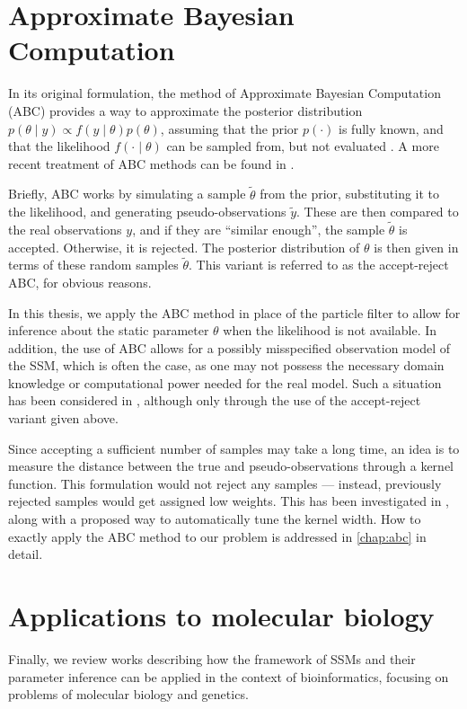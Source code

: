\section{Approximate Bayesian Computation}
In its original formulation, the method of Approximate Bayesian Computation (ABC) provides a way to approximate the posterior distribution $p(\theta \mid y) \propto f(y \mid \theta) p(\theta)$, assuming that the prior $p(\cdot)$ is fully known, and that the likelihood $f(\cdot \mid \theta)$ can be sampled from, but not evaluated \citep{abc-old-old, abc-old}. A more recent treatment of ABC methods can be found in \cite{abc-recent}.

Briefly, ABC works by simulating a sample $\tilde{\theta}$ from the prior, substituting it to the likelihood, and generating pseudo-observations $\tilde{y}$. These are then compared to the real observations $y$, and if they are ``similar enough'', the sample $\tilde{\theta}$ is accepted. Otherwise, it is rejected. The posterior distribution of $\theta$ is then given in terms of these random samples $\tilde{\theta}$. This variant is referred to as the accept-reject ABC, for obvious reasons.

In this thesis, we apply the ABC method in place of the particle filter to allow for inference about the static parameter $\theta$ when the likelihood is not available. In addition, the use of ABC allows for a possibly misspecified observation model of the SSM, which is often the case, as one may not possess the necessary domain knowledge or computational power needed for the real model. Such a situation has been considered in \cite{jasra-time-series}, although only through the use of the accept-reject variant given above.

Since accepting a sufficient number of samples may take a long time, an idea is to measure the distance between the true and pseudo-observations through a kernel function. This formulation would not reject any samples --- instead, previously rejected samples would get assigned low weights. This has been investigated in \cite{dedecius}, along with a proposed way to automatically tune the kernel width. How to exactly apply the ABC method to our problem is addressed in \autoref{chap:abc} in detail.

\section{Applications to molecular biology}
Finally, we review works describing how the framework of SSMs and their parameter inference can be applied in the context of bioinformatics, focusing on problems of molecular biology and genetics.

